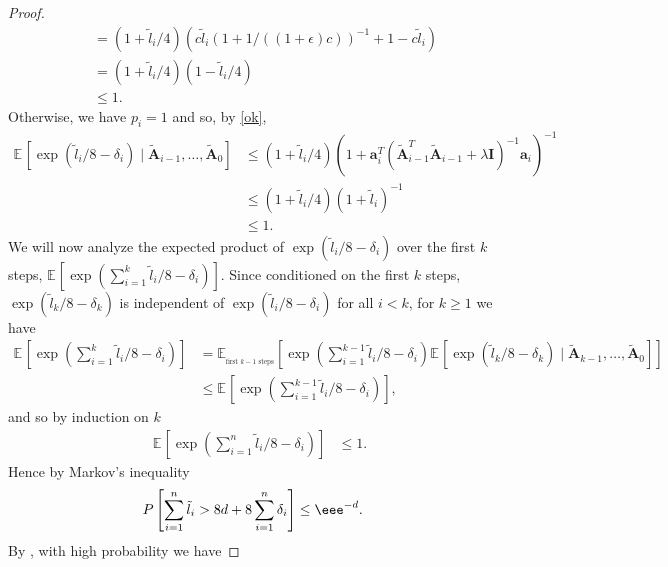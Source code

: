 \documentclass{toc}
\newcommand{\bv}[1]{\mathbf{#1}}
\newcommand{\expct}[3]{\mathbb{E}_{{#1}_{#2}}\left[#3\right]}
\newcommand{\prob}[1]{P\left[#1\right]}
\begin{document}
\begin{proof}
\begin{align*}
                                                    &= (1 + \tilde{l}_i/4) (c\tilde{l}_i (1 + 1/((1+\epsilon)c))^{-1} + 1 - c\tilde{l}_i)\\
                                                    &= (1 + \tilde{l}_i/4) (1 - \tilde{l}_i/4)\\
                                                    &\leq 1.
    \end{align*}
    Otherwise, we have $p_i = 1$ and so, by \eqref{ok},
    \begin{align*}
        \expct{}{}{\exp(\tilde{l}_i/8 - \delta_i) \mid \bv{\tilde A}_{i-1},\ldots, \bv{\tilde A}_{0}} &\leq (1 + \tilde{l}_i/4) (1 + \bv{a}_i^T (\bv{\tilde{A}}_{i-1}^T \bv{\tilde{A}}_{i-1} + \lambda \bv{I})^{-1} \bv{a}_i)^{-1} \\
                                                    &\leq (1 + \tilde{l}_i/4) (1 + \tilde{l}_i)^{-1} \\
                                                    &\leq 1.
    \end{align*}
    We will now analyze the expected product of $\exp(\tilde{l}_i/8 - \delta_i)$ over the first $k$ steps, $\expct{}{}{\exp\left(\sum_{i=1}^k \tilde{l}_i/8 - \delta_i\right)}$.
    Since conditioned on the first $k$ steps, $\exp(\tilde{l}_k/8 - \delta_k)$ is independent of $\exp(\tilde{l}_i/8 - \delta_i)$ for all $i < k$, for $k \geq 1$ we have %
    \begin{align*}
        \expct{}{}{\exp\left(\sum_{i=1}^k \tilde{l}_i/8 - \delta_i\right)} &= \expct{}{\text{first $k-1$ steps}}{\exp\left(\sum_{i=1}^{k-1} \tilde{l}_i/8 - \delta_i\right)\expct{}{}{\exp(\tilde{l}_k/8 - \delta_k) \mid \bv{\tilde A}_{k-1},\ldots, \bv{\tilde A}_{0}}}\\
                                                                         &\leq \expct{}{}{\exp\left(\sum_{i=1}^{k-1} \tilde{l}_i/8 - \delta_i\right)},
    \end{align*}
    and so by induction on $k$
    \begin{align*}
        \expct{}{}{\exp\left(\sum_{i=1}^n \tilde{l}_i/8 - \delta_i\right)} &\leq 1.
    \end{align*}
    Hence by Markov's inequality
    \begin{align*}
        \prob{\sum_{i=1}^n \tilde{l}_i > 8d + 8\sum_{i=1}^n \delta_i} &\leq \eee^{-d}.
    \end{align*}
    By , with high probability we have

\end{proof}
\end{document}
